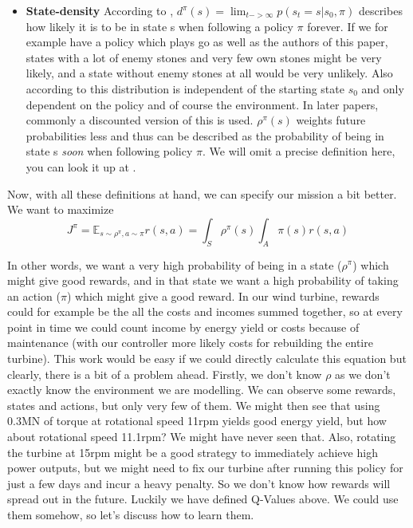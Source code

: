 \documentclass[hyperref,beleg]{cgvpub}
\begin{document}
\begin{itemize}
  \item \textbf{State-density} According to \cite{suttonPolicyGradientMethods}, $d^{\pi}(s) = \lim_{t -> \infty} p(s_t = s | s_0, \pi)$ describes how likely it is to be in state s when following a policy $\pi$ forever. If we for example have a policy which plays go as well as the authors of this paper, states with a lot of enemy stones and very few own stones might be very likely, and a state without enemy stones at all would be very unlikely. Also according to \cite{suttonPolicyGradientMethods} this distribution is independent of the starting state $s_0$ and only dependent on the policy and of course the environment. In later papers, commonly a discounted version of this is used. $\rho^{\pi}(s)$ weights future probabilities less and thus can be described as the probability of being in state s \textit{soon} when following policy $\pi$. We will omit a precise definition here, you can look it up at \cite[Section 2.1]{silverDeterministicPolicyGradient2013}.
\end{itemize}

Now, with all these definitions at hand, we can specify our mission a bit better. We want to maximize
\begin{equation}
J^{\pi} = \mathbb{E}_{s \sim \rho^{\pi}, a \sim \pi}r(s, a) = \int_S \rho^{\pi}(s) \int_A \pi(s) r(s, a)
\label{equ:maximize_rewards}
\end{equation}

In other words, we want a very high probability of being in a state ($\rho^{\pi}$) which might give good rewards, and in that state we want a high probability of taking an action ($\pi$) which might give a good reward. In our wind turbine, rewards could for example be the all the costs and incomes summed together, so at every point in time we could count income by energy yield or costs because of maintenance (with our controller more likely costs for rebuilding the entire turbine). This work would be easy if we could directly calculate this equation but clearly, there is a bit of a problem ahead. Firstly, we don't know $\rho$ as we don't exactly know the environment we are modelling. We can observe some rewards, states and actions, but only very few of them. We might then see that using 0.3MN of torque at rotational speed 11rpm yields good energy yield, but how about rotational speed 11.1rpm? We might have never seen that. Also, rotating the turbine at 15rpm might be a good strategy to immediately achieve high power outputs, but we might need to fix our turbine after running this policy for just a few days and incur a heavy penalty. So we don't know how rewards will spread out in the future. Luckily we have defined Q-Values above. We could use them somehow, so let's discuss how to learn them.
\end{document}
